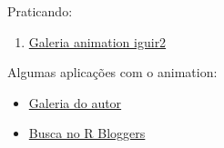 \begin{frame}

  Praticando:
  \begin{enumerate}
  \item \href{run:../animation/animation.html}{Galeria animation iguir2}
  \end{enumerate}
  
  \vspace{0.5cm} Algumas aplicações com o animation:
  \begin{itemize}
  \item
    \href{http://vis.supstat.com/categories.html\#animation-ref}{Galeria
      do autor}
  \item \href{http://www.r-bloggers.com/?s=animation}{Busca no R
      Bloggers}
  \end{itemize}

\end{frame}
